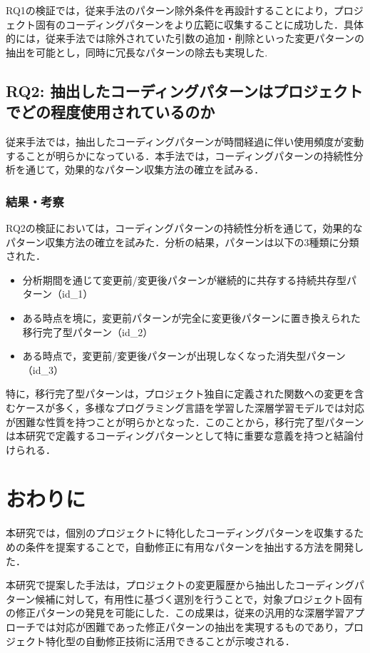 \documentclass[twocolumn]{jarticle} %
\newcommand{\RQtwo}{抽出したコーディングパターンはプロジェクトでどの程度使用されているのか}
\begin{document}
RQ1の検証では，従来手法のパターン除外条件を再設計することにより，プロジェクト固有のコーディングパターンをより広範に収集することに成功した．具体的には，従来手法では除外されていた引数の追加・削除といった変更パターンの抽出を可能とし，同時に冗長なパターンの除去も実現した.
\subsection{RQ2: \RQtwo}
従来手法\cite{devreplay}では，抽出したコーディングパターンが時間経過に伴い使用頻度が変動することが明らかになっている．本手法では，コーディングパターンの持続性分析を通じて，効果的なパターン収集方法の確立を試みる．
\subsubsection{結果・考察}
RQ2の検証においては，コーディングパターンの持続性分析を通じて，効果的なパターン収集方法の確立を試みた．分析の結果，パターンは以下の3種類に分類された．
\begin{itemize}
    \item 分析期間を通じて変更前/変更後パターンが継続的に共存する持続共存型パターン（id\_1）
    \item ある時点を境に，変更前パターンが完全に変更後パターンに置き換えられた移行完了型パターン（id\_2）
    \item ある時点で，変更前/変更後パターンが出現しなくなった消失型パターン（id\_3）
\end{itemize}

特に，移行完了型パターンは，プロジェクト独自に定義された関数への変更を含むケースが多く，多様なプログラミング言語を学習した深層学習モデルでは対応が困難な性質を持つことが明らかとなった．このことから，移行完了型パターンは本研究で定義するコーディングパターンとして特に重要な意義を持つと結論付けられる．
\section{おわりに}
本研究では，個別のプロジェクトに特化したコーディングパターンを収集するための条件を提案することで，自動修正に有用なパターンを抽出する方法を開発した．

本研究で提案した手法は，プロジェクトの変更履歴から抽出したコーディングパターン候補に対して，有用性に基づく選別を行うことで，対象プロジェクト固有の修正パターンの発見を可能にした．この成果は，従来の汎用的な深層学習アプローチでは対応が困難であった修正パターンの抽出を実現するものであり，プロジェクト特化型の自動修正技術に活用できることが示唆される．





\end{document}

